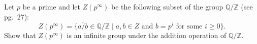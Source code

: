 Let \(p\) be a prime and let $Z(p^\infty )$ be the following subset of
the group $\mathbb{Q}/\mathbb{Z}$ (see pg.~27):
$$
Z(p^\infty )=\{\overline{a/b}\in\mathbb{Q}/\mathbb{Z}\mid a,b\in Z\text{ and }
b=p^i\text{ for some } i\ge 0\}.
$$
Show that ${Z}(p^\infty )$ is an infinite group under the addition
operation of $\mathbb{Q}/\mathbb{Z}$.